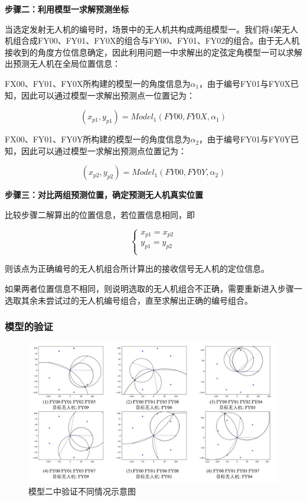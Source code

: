 \documentclass{my_paper}
\begin{document}
\textbf{步骤二：利用模型一求解预测坐标}

当选定发射无人机的编号时，场景中的无人机共构成两组模型一。我们将4架无人机组合成FY00、FY01、FY0X的组合与FY00、FY01、FY02的组合。由于无人机接收到的角度方位信息确定，因此利用问题一中求解出的定弦定角模型一可以求解出预测无人机在全局位置信息：

FX00、FY01、FY0X所构建的模型一的角度信息为$\alpha_1$，由于编号FY01与FY0X已知，因此可以通过模型一求解出预测点一位置记为：

\begin{equation}
    (x_{p1}, y_{p1}) = Model_1(FY00, FY0X, \alpha_1)
\end{equation}

FX00、FY01、FY0Y所构建的模型一的角度信息为$\alpha_2$，由于编号FY01与FY0Y已知，因此可以通过模型一求解出预测点位置记为：

\begin{equation}
    (x_{p2}, y_{p2}) = Model_1(FY00, FY0Y, \alpha_2)
\end{equation}

\textbf{步骤三：对比两组预测位置，确定预测无人机真实位置}

比较步骤二解算出的位置信息，若位置信息相同，即

\begin{equation}
    \begin{cases}
        x_{p1} = x_{p2}\\
        y_{p1} = y_{p2}\\
    \end{cases}
\end{equation}

则该点为正确编号的无人机组合所计算出的接收信号无人机的定位信息。

如果两者位置信息不相同，则说明选取的无人机组合不正确，需要重新进入步骤一选取其余未尝试过的无人机编号组合，直至求解出正确的编号组合。\\

\subsubsection{模型的验证}

\begin{figure}[h]
    \centering
    \includegraphics[width=1\textwidth]{duoqingkuang.jpg}
    \caption{模型二中验证不同情况示意图}
    \label{duoqingkuang}
\end{figure}
\end{document}

